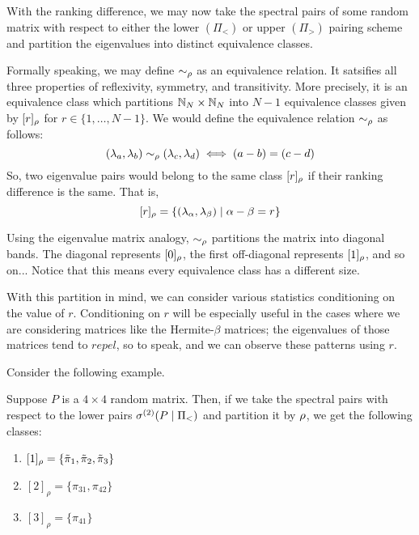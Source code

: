With the ranking difference, we may now take the spectral pairs of some random matrix with respect to either the lower $(\Pi_<)$ or upper $(\Pi_>)$ pairing scheme and partition the eigenvalues into distinct equivalence classes.

\begin{remark}
Formally speaking, we may define $\sim_{\rho}$ as an equivalence relation. It satsifies all three properties of reflexivity, symmetry, and transitivity. More precisely, it is an equivalence class which partitions $\mathbb{N}_N \times \mathbb{N}_N$ into $N - 1$ equivalence classes given by $[r]_{\rho}$ for $r \in \{1, \dots, N-1\}$. We would define the equivalence relation $\sim_{\rho}$ as follows:
$$(\lambda_a,\lambda_b) \sim_{\rho} (\lambda_c,\lambda_d) \iff (a -b) = (c-d)$$
So, two eigenvalue pairs would belong to the same class $[r]_{\rho}$ if their ranking difference is the same. That is,
$$[r]_{\rho} = \{(\lambda_\alpha, \lambda_\beta) \mid \alpha - \beta = r\}$$
\end{remark}

\begin{remark}
Using the eigenvalue matrix analogy, $\sim_{\rho}$ partitions the matrix into diagonal bands. The diagonal represents $[0]_{\rho}$, the first off-diagonal represents $[1]_{\rho}$, and so on... Notice that this means every equivalence class has a different size.
\end{remark}

With this partition in mind, we can consider various statistics conditioning on the value of $r$. Conditioning on $r$ will be especially useful in the cases where we are considering matrices like the Hermite-$\beta$ matrices; the eigenvalues of those matrices tend to $\textit{repel}$, so to speak, and we can observe these patterns using $r$.

Consider the following example.

\begin{example}
Suppose $P$ is a $4 \times 4$ random matrix. Then, if we take the spectral pairs with respect to the lower pairs ${\sigma^{(2)}}(P \mid \Pi_<)$ and partition it by ${\rho}$, we get the following classes:
\begin{enumerate}
  \item $[1]_\rho = \{{\tilde{\pi}}_1, {\tilde{\pi}}_2, {\tilde{\pi}}_3\}$
  \item $[2]_\rho = \{\pi_{31}, \pi_{42}\}$
  \item $[3]_\rho = \{\pi_{41}\}$
\end{enumerate}
\end{example}


